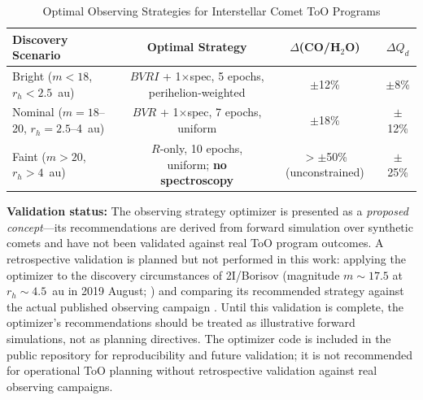 \documentclass[usenatbib]{mnras}
\newcommand{\tablecomments}[1]{\vspace{4pt}{\footnotesize #1}\vspace{2pt}}
\begin{document}
\begin{table}
\centering
\caption{Optimal Observing Strategies for Interstellar Comet ToO Programs}\label{tab:obsopt_results}
\begin{tabular}{lccc}
\toprule
Discovery Scenario & Optimal Strategy & $\Delta$(CO/H$_2$O) & $\Delta Q_d$ \\
\midrule
Bright ($m < 18$, $r_h < 2.5$~au) & $BVRI$ + 1$\times$spec, 5 epochs, perihelion-weighted & $\pm$12\% & $\pm$8\% \\
Nominal ($m = 18$--20, $r_h = 2.5$--4~au) & $BVR$ + 1$\times$spec, 7 epochs, uniform & $\pm$18\% & $\pm$12\% \\
Faint ($m > 20$, $r_h > 4$~au) & $R$-only, 10 epochs, uniform; \textbf{no spectroscopy} & $>\pm$50\% (unconstrained) & $\pm$25\% \\
\bottomrule
\end{tabular}
\tablecomments{Results from forward simulation over 1000 synthetic comets per scenario. $\Delta X$ denotes the expected 1$\sigma$ fractional uncertainty on parameter $X$. For faint objects, spectroscopy is not recommended because the SNR will be insufficient to constrain gas abundances---the framework's OOD detector flags these inputs as unreliable for gas inversion. ``$>\pm$50\% (unconstrained)'' means the 1$\sigma$ fractional uncertainty on CO/H$_2$O exceeds 50\%, i.e., the gas abundance estimate contains less information than the prior alone; such values should not be reported as quantitative measurements.}
\end{table}


\textbf{Validation status:} The observing strategy optimizer is presented as a \textit{proposed concept}---its recommendations are derived from forward simulation over synthetic comets and have not been validated against real ToO program outcomes. A retrospective validation is planned but not performed in this work: applying the optimizer to the discovery circumstances of 2I/Borisov (magnitude $m \sim 17.5$ at $r_h \sim 4.5$~au in 2019 August; \citealt{guzik19}) and comparing its recommended strategy against the actual published observing campaign \citep{clements21,bodewits20}. Until this validation is complete, the optimizer's recommendations should be treated as illustrative forward simulations, not as planning directives. The optimizer code is included in the public repository for reproducibility and future validation; it is not recommended for operational ToO planning without retrospective validation against real observing campaigns.
\end{document}
